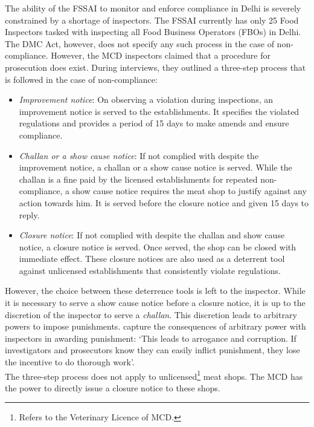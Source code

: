 \documentclass[a4paper, 12pt, twoside]{article}
\begin{document}
The ability of the FSSAI to monitor and enforce compliance in Delhi is severely constrained by a shortage of inspectors. The FSSAI currently has only 25 Food Inspectors tasked with inspecting all Food Business Operators (FBOs) in Delhi.\\

The DMC Act, however, does not specify any such process in the case of non-compliance. However, the MCD inspectors claimed that a procedure for prosecution does exist. During interviews, they outlined a three-step process that is followed in the case of non-compliance:\\
\begin{itemize}
\item \textit{Improvement notice}: On observing a violation during inspections, an improvement notice is served to the establishments. It specifies the violated regulations and provides a period of 15 days to make amends and ensure compliance.
\item \textit{Challan or a show cause notice}: If not complied with despite the improvement notice, a challan or a show cause notice is served. While the challan is a fine paid by the licensed establishments for repeated non-compliance, a show cause notice requires the meat shop to justify against any action towards him. It is served before the closure notice and given 15 days to reply. 
\item \textit{Closure notice}: If not complied with despite the challan and show cause notice, a closure notice is served. Once served, the shop can be closed with immediate effect. These closure notices are also used as a deterrent tool against unlicensed establishments that consistently violate regulations. \\
\end{itemize}

However, the choice between these deterrence tools is left to the inspector. While it is necessary to serve a show cause notice before a closure notice, it is up to the discretion of the inspector to serve a \textit{challan}. This discretion leads to arbitrary powers to impose punishments. \cite{roychapter} capture the consequences of arbitrary power with inspectors in awarding punishment: ‘This leads to arrogance and corruption. If investigators and prosecutors know they can easily inflict punishment, they lose the incentive to do thorough work’.\\

The three-step process does not apply to unlicensed\footnote{ Refers to the Veterinary Licence of MCD.} meat shops. The MCD has the power to directly issue a closure notice to these shops.
\end{document}

